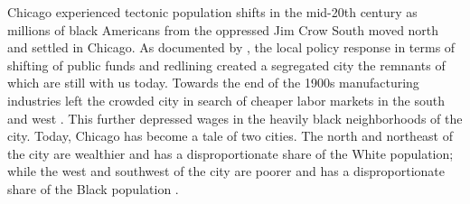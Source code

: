 \documentclass[12pt]{article}
\begin{document}
Chicago experienced tectonic population shifts in the mid-20th century as millions of black Americans from the oppressed Jim Crow South moved north and settled in Chicago. As documented by \citet{derenoncourt2022}, the local policy response in terms of shifting of public funds and redlining created a segregated city the remnants of which are still with us today. Towards the end of the 1900s manufacturing industries left the crowded city in search of cheaper labor markets in the south and west \citep{chicagobrit}. This further depressed wages in the heavily black neighborhoods of the city. Today, Chicago has become a tale of two cities. The north and northeast of the city are wealthier and has a disproportionate share of the White population; while the west and southwest of the city are poorer and has a disproportionate share of the Black population \citep{southside2022}. 
\end{document}
